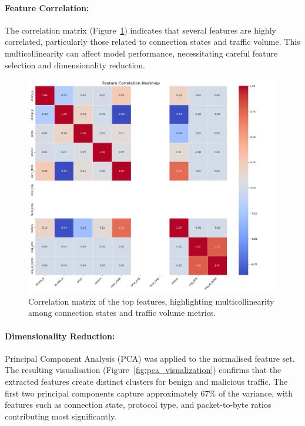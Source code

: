 \paragraph{Feature Correlation:}
The correlation matrix (Figure~\ref{fig:correlation_matrix}) indicates that several features are highly correlated, particularly those related to connection states and traffic volume. This multicollinearity can affect model performance, necessitating careful feature selection and dimensionality reduction.

\begin{figure}[htbp]
    \centering
    \includegraphics[width=\textwidth]{figures/feature_correlation.png}
    \caption{Correlation matrix of the top features, highlighting multicollinearity among connection states and traffic volume metrics.}
    \label{fig:correlation_matrix}
\end{figure}



\paragraph{Dimensionality Reduction:}  
Principal Component Analysis (PCA) was applied to the normalised feature set. The resulting visualisation (Figure~\ref{fig:pca_visualization}) confirms that the extracted features create distinct clusters for benign and malicious traffic. The first two principal components capture approximately 67\% of the variance, with features such as connection state, protocol type, and packet-to-byte ratios contributing most significantly.

